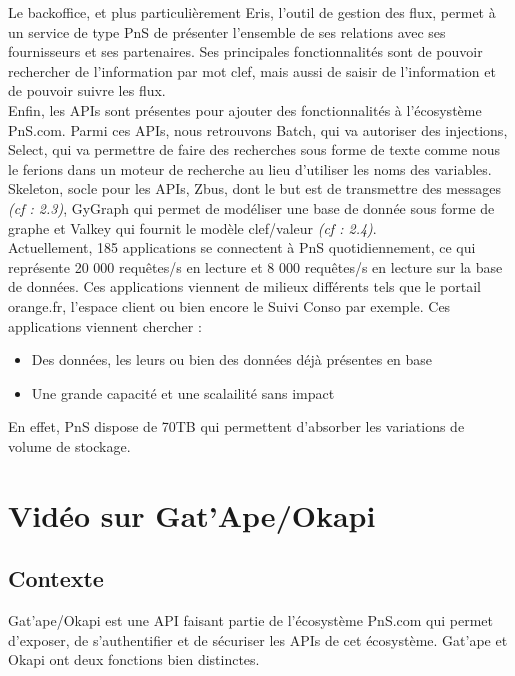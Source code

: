 Le backoffice, et plus particulièrement Eris, l'outil de gestion des flux, permet à un service de type PnS de présenter l'ensemble de ses relations avec ses fournisseurs et ses partenaires. Ses principales fonctionnalités sont de pouvoir rechercher de l'information par mot clef, mais aussi de saisir de l'information et de pouvoir suivre les flux.\\

Enfin, les APIs sont présentes pour ajouter des fonctionnalités à l'écosystème PnS.com. Parmi ces APIs, nous retrouvons Batch, qui va autoriser des injections, Select, qui va permettre de faire des recherches sous forme de texte comme nous le ferions dans un moteur de recherche au lieu d'utiliser les noms des variables. Skeleton, socle pour les APIs, Zbus, dont le but est de transmettre des messages \textit{(cf : 2.3)}, GyGraph qui permet de modéliser une base de donnée sous forme de graphe et Valkey qui fournit le modèle clef/valeur \textit{(cf : 2.4)}.\\

Actuellement, 185 applications se connectent à PnS quotidiennement, ce qui représente 20 000 requêtes/s en lecture et 8 000 requêtes/s en lecture sur la base de données. Ces applications viennent de milieux différents tels que le portail orange.fr, l'espace client ou bien encore le Suivi Conso par exemple. Ces applications viennent chercher : 

\begin{itemize}
\item Des données, les leurs ou bien des données déjà présentes en base
\item Une grande capacité et une scalailité sans impact
\end{itemize}
 
 En effet, PnS dispose de 70TB qui permettent d'absorber les variations de volume de stockage.

\section{Vidéo sur Gat'Ape/Okapi}

\subsection{Contexte}
Gat'ape/Okapi est une API faisant partie de l'écosystème PnS.com qui permet d'exposer, de s'authentifier et de sécuriser les APIs de cet écosystème. Gat'ape et Okapi ont deux fonctions bien distinctes.\\

